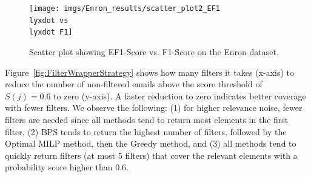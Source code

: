 \begin{figure}[H]
\begin{centering}
\par\end{centering}
\begin{centering}
{\texttt{[image: imgs/Enron\_results/scatter\_plot2\_EF1\\lyxdot vs\\lyxdot F1]}}
\par\end{centering}
\caption{Scatter plot showing EF1-Score vs. F1-Score on the Enron dataset.}
\label{fig:F1_vs_EF1_Enron}
\end{figure}






 Figure~\ref{fig:FilterWrapperStrategy} shows how many filters it takes (x-axis) to reduce the number of non-filtered emails above the score threshold of $S(j)=0.6$ to zero (y-axis).  A faster reduction to zero indicates better coverage with fewer filters.  We observe the following: (1) for higher relevance noise, fewer filters are needed since all methods tend to return most elements in the first filter, (2) BPS tends to return the highest number of filters, followed by the Optimal MILP method, then the Greedy method, and (3) all methods tend to quickly return filters (at most 5 filters) that cover the relevant elements with a probability score higher than 0.6.



